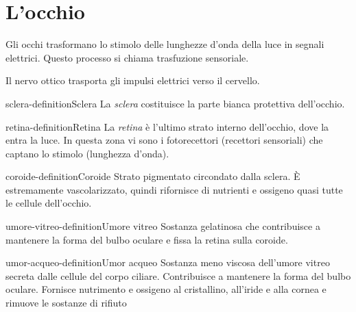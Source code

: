 \documentclass[preview]{standalone}
\begin{document}
\genpage

\section{L'occhio}

\begin{plainhtml}
    Gli occhi trasformano lo stimolo delle lunghezze d'onda della luce in segnali elettrici.
    Questo processo si chiama trasfuzione sensoriale.
\end{plainhtml}


\begin{plainhtml}
    Il nervo ottico trasporta gli impulsi elettrici verso il cervello.
\end{plainhtml}

\begin{snippetdefinition}{sclera-definition}{Sclera}
    La \textit{sclera} costituisce la parte bianca protettiva dell'occhio.
\end{snippetdefinition}

\begin{snippetdefinition}{retina-definition}{Retina}
    La \textit{retina} è l'ultimo strato interno dell'occhio, dove la entra la luce.
    In questa zona vi sono i fotorecettori (recettori sensoriali) che captano lo stimolo (lunghezza d'onda).
\end{snippetdefinition}

\begin{snippetdefinition}{coroide-definition}{Coroide}
    Strato pigmentato circondato dalla sclera. È estremamente vascolarizzato, quindi rifornisce
    di nutrienti e ossigeno quasi tutte le cellule dell'occhio.
\end{snippetdefinition}

\begin{snippetdefinition}{umore-vitreo-definition}{Umore vitreo}
    Sostanza gelatinosa che contribuisce a mantenere la forma del bulbo oculare e fissa la
    retina sulla coroide.
\end{snippetdefinition}

\begin{snippetdefinition}{umor-acqueo-definition}{Umor acqueo}
    Sostanza meno viscosa dell'umore vitreo secreta dalle cellule del corpo ciliare. Contribuisce
    a mantenere la forma del bulbo oculare. Fornisce nutrimento e ossigeno al cristallino,
    all'iride e alla cornea e rimuove le sostanze di rifiuto
\end{snippetdefinition}
\end{document}

